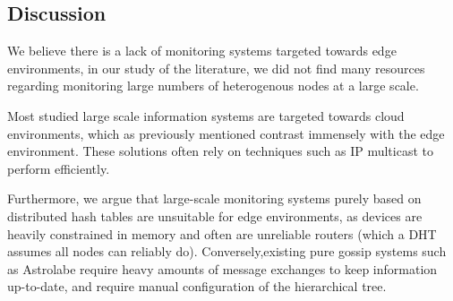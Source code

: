 \subsection{Discussion}

We believe there is a lack of monitoring systems targeted towards edge environments, in our study of the literature, we did not find many resources regarding monitoring large numbers of heterogenous nodes at a large scale.

Most studied large scale information systems are targeted towards cloud environments, which as previously mentioned contrast immensely with the edge environment. These solutions often rely on techniques such as IP multicast \cite{massie2004ganglia} to perform efficiently.

Furthermore, we argue that large-scale monitoring systems purely based on distributed hash tables \cite{10.1145/1030194.1015509} are unsuitable for edge environments, as  devices are heavily constrained in memory and often are unreliable routers (which a DHT assumes all nodes can reliably do).  Conversely,existing pure gossip systems such as Astrolabe \cite{Renesse2003} require heavy amounts of message exchanges to keep information up-to-date, and require manual configuration of the hierarchical tree.


